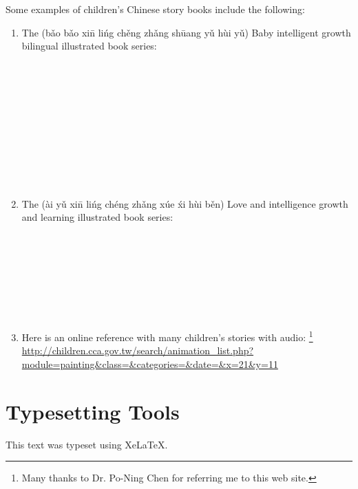 Some examples of children's Chinese story books include the following:
\begin{enumerate}
  \item The 
        {\normalfont(b\v{a}o b\v{a}o xi\=n li\'ng ch\v{e}ng zh\v{a}ng sh\=uang y\v{u} h\`ui y\v{u})}
        Baby intelligent growth bilingual illustrated book series:
    \\
    \\
    \\
    \\
    \\
    \\
    \\
    \\
    \\
    \\
    \\

  \item The 
        {\normalfont(\`ai y\v{u} xi\=n li\'ng ch\'eng zh\v{a}ng x\'ue \'xi h\`ui b\v{e}n)}
        Love and intelligence growth and learning illustrated book series:
    \\
    \\
    \\
    \\
    \\
    \\
    \\
    \\

  \item Here is an online reference with many children's stories with audio:
        \footnote{Many thanks to Dr. Po-Ning Chen  for referring me to this web site.}
        \\\url{http://children.cca.gov.tw/search/animation_list.php?module=painting&class=&categories=&date=&x=21&y=11}

\end{enumerate}



\section*{Typesetting Tools}
  This text was typeset using Xe\LaTeX.



